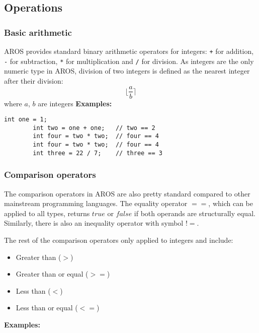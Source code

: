 \subsection{Operations}
\subsubsection{Basic arithmetic}
    AROS provides standard binary arithmetic operators for integers: \lstinline{+} for addition, \lstinline{-} for subtraction, \lstinline{*} for multiplication and \lstinline{/} for division. As integers are the only numeric type in AROS, division of two integers is defined as the nearest integer after their division: 
    \begin{equation*}
        \lfloor\frac{a}{b}\rceil
    \end{equation*}
    where $a$, $b$ are integers 
    \newline \textbf{Examples:}
    \begin{lstlisting}[language=aros, caption=Basic arithmetic examples]
        int one = 1;
        int two = one + one;   // two == 2 
        int four = two * two;  // four == 4 
        int four = two * two;  // four == 4 
        int three = 22 / 7;    // three == 3
    \end{lstlisting}
\subsubsection{Comparison operators}
    The comparison operators in AROS are also pretty standard compared to other mainstream programming languages. The equality operator $==$, which can be applied to all types, returns $true$ or $false$ if both operands are structurally equal. Similarly, there is also an inequality operator with symbol $!=$.
    \par The rest of the comparison operators only applied to integers and include:
    \begin{itemize}
        \item Greater than ($>$)
        \item Greater than or equal ($>=$)
        \item Less than ($<$)
        \item Less than or equal ($<=$)
    \end{itemize}
    \textbf{Examples:}
    
